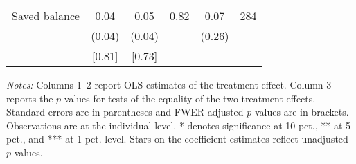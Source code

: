 \begin{table}[h]
{\begin{threeparttable}
\begin{tabular}{l*{5}{c}}
Saved balance&     0.04&     0.05&     0.82&     0.07&      284\\
          &   (0.04)&   (0.04)&         &   (0.26)&         \\
          &   [0.81]&   [0.73]&         &         &         \\
\bottomrule \end{tabular} \begin{tablenotes}[flushleft] \footnotesize \item \emph{Notes:} Columns 1--2 report OLS estimates of the treatment effect. Column 3 reports the \(p\)-values for tests of the equality of the two treatment effects. Standard errors are in parentheses and FWER adjusted \(p\)-values are in brackets. Observations are at the individual level. * denotes significance at 10 pct., ** at 5 pct., and *** at 1 pct. level. Stars on the coefficient estimates reflect unadjusted \(p\)-values. \end{tablenotes} \end{threeparttable} } \end{table}

